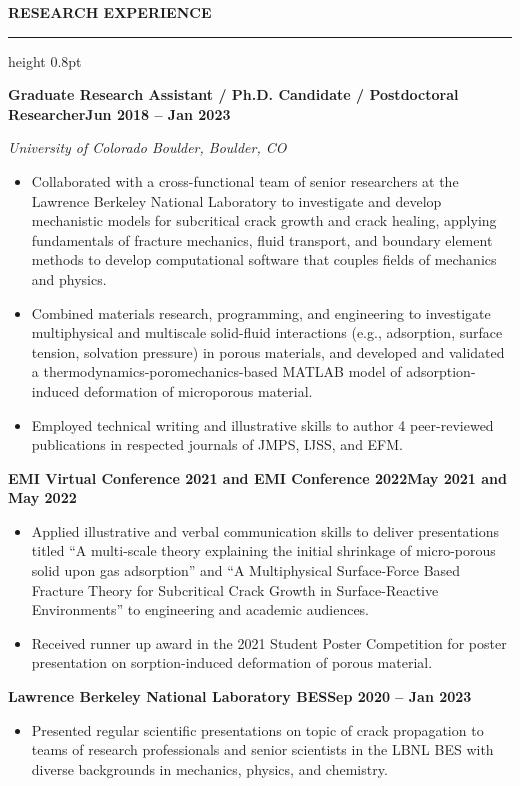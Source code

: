 \documentclass[10pt, letterpaper]{article}
\newcommand{\rsection}[1]{%
  \vspace{8pt}%
  {\large\bfseries\MakeUppercase{#1}}%
  \vspace{1pt}%
  \hrule height 0.8pt%
  \vspace{4pt}%
}
\newcommand{\jobline}[2]{%
  \vspace{5pt}%
  \noindent\textbf{#1}\hfill\textbf{#2}\par%
  \vspace{1pt}%
}
\newcommand{\subline}[1]{%
  \vspace{-1pt}%
  \noindent\textit{#1}\par%
  \vspace{1pt}%
}
\newenvironment{rlist}{%
  \begin{itemize}[leftmargin=1.4em, itemsep=1pt, topsep=2pt, parsep=0pt]%
}{%
  \end{itemize}%
}
\begin{document}
\rsection{Research Experience}

\jobline{Graduate Research Assistant / Ph.D. Candidate / Postdoctoral Researcher}{Jun 2018 -- Jan 2023}
\subline{University of Colorado Boulder, Boulder, CO}
\begin{rlist}
  \item Collaborated with a cross-functional team of senior researchers at the Lawrence Berkeley National Laboratory to investigate and develop mechanistic models for subcritical crack growth and crack healing, applying fundamentals of fracture mechanics, fluid transport, and boundary element methods to develop computational software that couples fields of mechanics and physics.
  \item Combined materials research, programming, and engineering to investigate multiphysical and multiscale solid-fluid interactions (e.g., adsorption, surface tension, solvation pressure) in porous materials, and developed and validated a thermodynamics-poromechanics-based MATLAB model of adsorption-induced deformation of microporous material.
  \item Employed technical writing and illustrative skills to author 4 peer-reviewed publications in respected journals of JMPS, IJSS, and EFM.
\end{rlist}

\jobline{EMI Virtual Conference 2021 and EMI Conference 2022}{May 2021 and May 2022}
\begin{rlist}
  \item Applied illustrative and verbal communication skills to deliver presentations titled ``A multi-scale theory explaining the initial shrinkage of micro-porous solid upon gas adsorption'' and ``A Multiphysical Surface-Force Based Fracture Theory for Subcritical Crack Growth in Surface-Reactive Environments'' to engineering and academic audiences.
  \item Received runner up award in the 2021 Student Poster Competition for poster presentation on sorption-induced deformation of porous material.
\end{rlist}

\jobline{Lawrence Berkeley National Laboratory BES}{Sep 2020 -- Jan 2023}
\begin{rlist}
  \item Presented regular scientific presentations on topic of crack propagation to teams of research professionals and senior scientists in the LBNL BES with diverse backgrounds in mechanics, physics, and chemistry.
\end{rlist}
\end{document}
